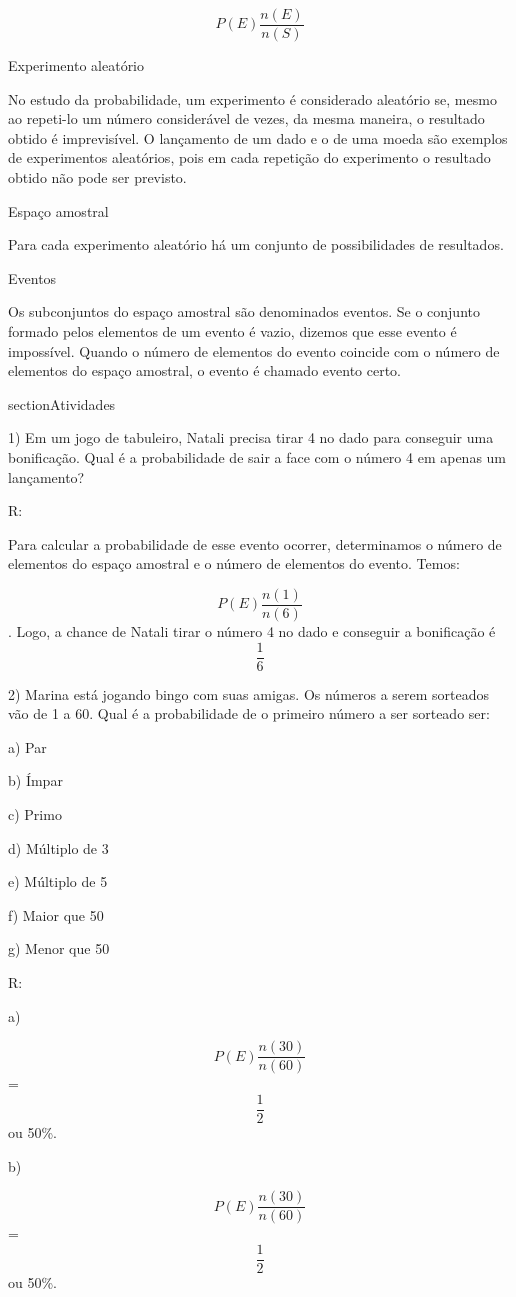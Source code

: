 \[P(E)\frac{n(E)}{n(S)}\]

Experimento aleatório

No estudo da probabilidade, um experimento é considerado aleatório se,
mesmo ao repeti-lo um número considerável de vezes, da mesma maneira, o
resultado obtido é imprevisível. O lançamento de um dado e o de uma
moeda são exemplos de experimentos aleatórios, pois em cada repetição do
experimento o resultado obtido não pode ser previsto.

Espaço amostral

Para cada experimento aleatório há um conjunto de possibilidades de
resultados.

Eventos

Os subconjuntos do espaço amostral são denominados eventos. Se o
conjunto formado pelos elementos de um evento é vazio, dizemos que esse
evento é impossível. Quando o número de elementos do evento coincide com
o número de elementos do espaço amostral, o evento é chamado evento
certo.

section{Atividades}

1) Em um jogo de tabuleiro, Natali precisa tirar 4 no dado para
conseguir uma bonificação. Qual é a probabilidade de sair a face com o
número 4 em apenas um lançamento?

R:

Para calcular a probabilidade de esse evento ocorrer, determinamos o
número de elementos do espaço amostral e o número de elementos do
evento. Temos:

\[P(E)\frac{n(1)}{n(6)}\]. Logo, a chance de Natali tirar o número 4 no
dado e conseguir a bonificação é \[\frac{1}{6}\]

2) Marina está jogando bingo com suas amigas. Os números a serem
sorteados vão de 1 a 60. Qual é a probabilidade de o primeiro número a
ser sorteado ser:

a) Par

b) Ímpar

c) Primo

d) Múltiplo de 3

e) Múltiplo de 5

f) Maior que 50

g) Menor que 50

R:

a)

\[P(E)\frac{n(30)}{n(60)}\] = \[\frac{1}{2}\] ou 50\%.

b)

\[P(E)\frac{n(30)}{n(60)}\] = \[\frac{1}{2}\] ou 50\%.

